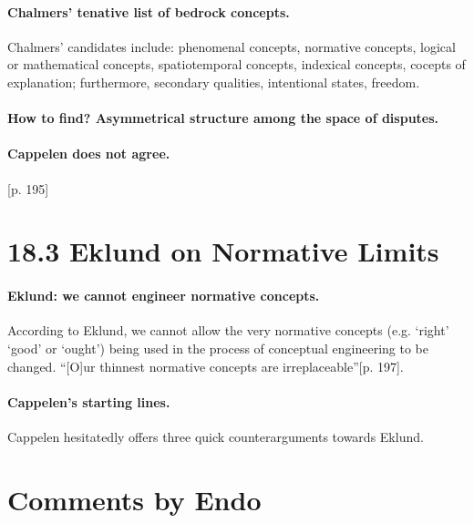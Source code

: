 \documentclass[
10pt, %
a4paper, %
twocolumn, %
landscape %
]{article}
\begin{document}
\paragraph{Chalmers' tenative list of bedrock concepts.}
Chalmers' candidates include: phenomenal concepts, normative concepts, logical or mathematical concepts,
spatiotemporal concepts, indexical concepts, cocepts of explanation; furthermore,
secondary qualities, intentional states, freedom.
\cite[p.552]{Chalmers2011}

\paragraph{How to find? Asymmetrical structure among the space of disputes.}

\paragraph{Cappelen does not agree.}
[p. 195]

\section*{18.3 Eklund on Normative Limits}
\paragraph{Eklund: we cannot engineer normative concepts.}
According to Eklund, we cannot allow the very normative concepts (e.g. `right' `good' or `ought') being used in the process of conceptual engineering to be changed.
``[O]ur thinnest normative concepts are irreplaceable''[p. 197].

\paragraph{Cappelen's starting lines.}
Cappelen hesitatedly offers three quick counterarguments towards Eklund.

\section*{Comments by Endo}



\end{document}
